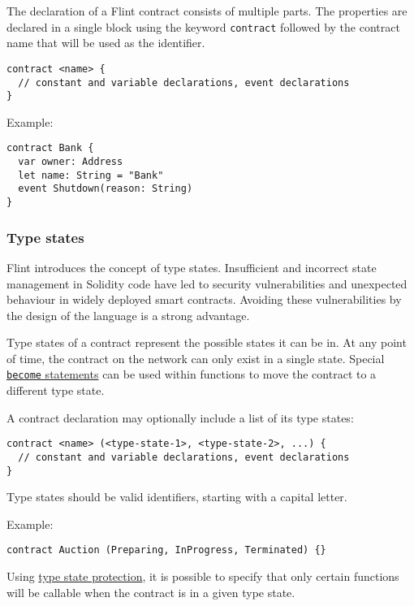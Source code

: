 The declaration of a Flint contract consists of multiple parts. The properties are declared in a single block using the keyword \texttt{contract} followed by the contract name that will be used as the identifier.

\begin{verbatim}
contract <name> {
  // constant and variable declarations, event declarations
}
\end{verbatim}

Example:

\begin{verbatim}
contract Bank {
  var owner: Address
  let name: String = "Bank"
  event Shutdown(reason: String)
}
\end{verbatim}

\subsubsection{Type states}
\label{sec:appendix-b-type-states}

Flint introduces the concept of type states. Insufficient and incorrect state management in Solidity code have led to security vulnerabilities and unexpected behaviour in widely deployed smart contracts. Avoiding these vulnerabilities by the design of the language is a strong advantage.

Type states of a contract represent the possible states it can be in. At any point of time, the contract on the network can only exist in a single state. Special \hyperref[sec:appendix-b-become-statements]{\texttt{become} statements} can be used within functions to move the contract to a different type state.

A contract declaration may optionally include a list of its type states:

\begin{verbatim}
contract <name> (<type-state-1>, <type-state-2>, ...) {
  // constant and variable declarations, event declarations
}
\end{verbatim}

Type states should be valid identifiers, starting with a capital letter.

Example:

\begin{verbatim}
contract Auction (Preparing, InProgress, Terminated) {}
\end{verbatim}

Using \hyperref[sec:appendix-b-type-state-protection]{type state protection}, it is possible to specify that only certain functions will be callable when the contract is in a given type state.

